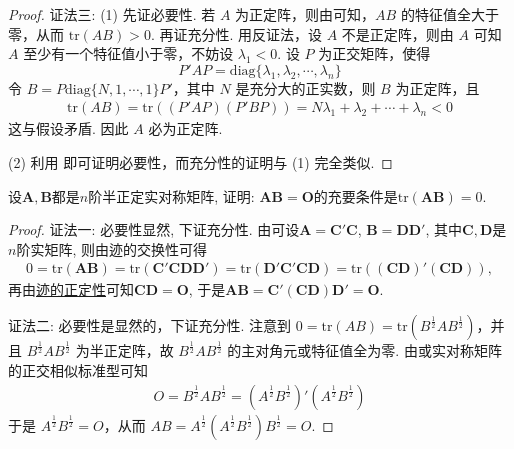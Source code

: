 \documentclass[../../main.tex]{subfiles}
\begin{document}
\begin{proof}
{\color{blue}证法三:}
(1) 先证必要性. 若 \(A\) 为正定阵，则由可知，\(AB\) 的特征值全大于零，从而 \(\mathrm{tr}(AB)>0\). 再证充分性. 用反证法，设 \(A\) 不是正定阵，则由 \(A\) 可知 \(A\) 至少有一个特征值小于零，不妨设 \(\lambda_1 < 0\). 设 \(P\) 为正交矩阵，使得
\[
P'AP = \mathrm{diag}\{\lambda_1,\lambda_2,\cdots,\lambda_n\}
\]
令 \(B = P\mathrm{diag}\{N,1,\cdots,1\}P'\)，其中 \(N\) 是充分大的正实数，则 \(B\) 为正定阵，且
\begin{align*}
\mathrm{tr}(AB) = \mathrm{tr}\left((P'AP)(P'BP)\right) = N\lambda_1 + \lambda_2 + \cdots + \lambda_n < 0
\end{align*}
这与假设矛盾. 因此 \(A\) 必为正定阵.

(2) 利用 即可证明必要性，而充分性的证明与 (1) 完全类似. 

\end{proof}

\begin{proposition}\label{proposition:A为实半正定阵AB=O的充要条件为tr(AB)=0}
设$\boldsymbol{A}, \boldsymbol{B}$都是$n$阶半正定实对称矩阵, 证明: $\boldsymbol{A}\boldsymbol{B}=\boldsymbol{O}$的充要条件是$\text{tr}(\boldsymbol{A}\boldsymbol{B}) = 0$.
\end{proposition}
\begin{proof}
{\color{blue}证法一:}
必要性显然, 下证充分性. 由可设$\boldsymbol{A}=\boldsymbol{C}'\boldsymbol{C}$, $\boldsymbol{B}=\boldsymbol{D}\boldsymbol{D}'$, 其中$\boldsymbol{C}, \boldsymbol{D}$是$n$阶实矩阵, 则由迹的交换性可得
\begin{align*}
0 = \text{tr}(\boldsymbol{A}\boldsymbol{B}) = \text{tr}(\boldsymbol{C}'\boldsymbol{C}\boldsymbol{D}\boldsymbol{D}') = \text{tr}(\boldsymbol{D}'\boldsymbol{C}'\boldsymbol{C}\boldsymbol{D}) = \text{tr}\left((\boldsymbol{C}\boldsymbol{D})'(\boldsymbol{C}\boldsymbol{D})\right),
\end{align*}
再由\hyperref[proposition:零矩阵的充要条件]{迹的正定性}可知$\boldsymbol{C}\boldsymbol{D}=\boldsymbol{O}$, 于是$\boldsymbol{A}\boldsymbol{B}=\boldsymbol{C}'(\boldsymbol{C}\boldsymbol{D})\boldsymbol{D}'=\boldsymbol{O}$. 

{\color{blue}证法二:}
必要性是显然的，下证充分性. 注意到 \(0 = \mathrm{tr}(AB) = \mathrm{tr}(B^{\frac{1}{2}}AB^{\frac{1}{2}})\)，并且 \(B^{\frac{1}{2}}AB^{\frac{1}{2}}\) 为半正定阵，故 \(B^{\frac{1}{2}}AB^{\frac{1}{2}}\) 的主对角元或特征值全为零. 由或实对称矩阵的正交相似标准型可知
\begin{align*}
O = B^{\frac{1}{2}}AB^{\frac{1}{2}} = (A^{\frac{1}{2}}B^{\frac{1}{2}})'(A^{\frac{1}{2}}B^{\frac{1}{2}})
\end{align*}
于是 \(A^{\frac{1}{2}}B^{\frac{1}{2}} = O\)，从而 \(AB = A^{\frac{1}{2}}(A^{\frac{1}{2}}B^{\frac{1}{2}})B^{\frac{1}{2}} = O\). 

\end{proof}
\end{document}
